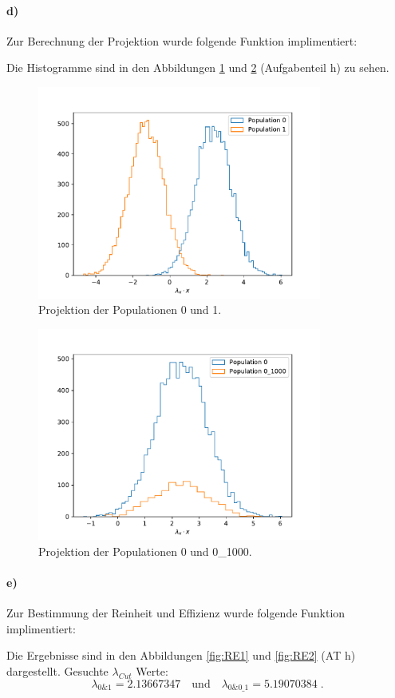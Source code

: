 \paragraph{d)}
Zur Berechnung der Projektion wurde folgende Funktion implimentiert:

Die Histogramme sind in den Abbildungen \ref{fig:hist01} und \ref{fig:hist001} (Aufgabenteil h) zu sehen.
\begin{figure}
  \centering
  \includegraphics[height = 7cm]{plots/Projektion1dimhist.pdf}
  \caption{Projektion der Populationen 0 und 1.}
  \label{fig:hist01}
\end{figure}
\begin{figure}
  \centering
  \includegraphics[height = 7cm]{plots/2Projektion1dimhist.pdf}
  \caption{Projektion der Populationen 0 und 0\_1000.}
  \label{fig:hist001}
\end{figure}
\FloatBarrier
\paragraph{e)}
Zur Bestimmung der Reinheit und Effizienz wurde folgende Funktion implimentiert:

Die Ergebnisse sind in den Abbildungen \ref{fig:RE1} und \ref{fig:RE2} (AT h) dargestellt. 
Gesuchte $\lambda_{Cut}$ Werte:
\begin{equation}
\lambda_{0\&1} = 2.13667347 \quad \text{und} \quad \lambda_{0\&0\_1} = 5.19070384	\; .
\end{equation}

